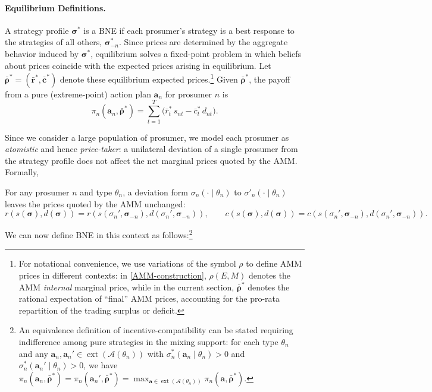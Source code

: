 \documentclass[12pt, notitlepage]{article}
\begin{document}
\paragraph{Equilibrium Definitions.}
A strategy profile $\boldsymbol{\sigma}^*$ is a BNE if each prosumer's strategy is a best response to the strategies of all others, $\boldsymbol{\sigma}_{-n}^*$. Since prices are determined by the aggregate behavior induced by $\boldsymbol{\sigma}^*$, equilibrium solves a fixed-point problem in which beliefs about prices coincide with the expected prices arising in equilibrium. Let $\bar{\boldsymbol{\rho}}^* = (\bar{\boldsymbol{r}}^*, \bar{\boldsymbol{c}}^*)$ denote these equilibrium expected prices.\footnote{For notational convenience, we use variations of the symbol $\rho$ to define AMM prices in different contexts: in \cref{AMM-construction}, $\rho(E,M)$ denotes the AMM \textit{internal} marginal price, while in the current section, $\bar{\boldsymbol{\rho}}^*$ denotes the rational expectation of ``final'' AMM prices, accounting for the pro-rata repartition of the trading surplus or deficit.} Given $\bar{\boldsymbol{\rho}}^*$, the payoff from a pure (extreme-point) action plan $\mathbf{a}_n$ for prosumer $n$ is
$$    \pi_n(\mathbf{a}_n, \bar{\boldsymbol{\rho}}^*)
        = \sum_{t=1}^T 
            \big( \bar{r}_t^*\, s_{nt} - \bar{c}_t^*\, d_{nt} \big).$$

Since we consider a large population of prosumer, we model each prosumer as \emph{atomistic} and hence \emph{price-taker}: a unilateral deviation of a single prosumer from the strategy profile does not affect the net marginal prices quoted by the AMM. Formally,

\begin{assumption}[Atomicity]\label{as:mean_field}
For any prosumer $n$ and type $\theta_n$, a deviation form  $\sigma_n(\cdot \mid \theta_n)$ to $\sigma'_n(\cdot \mid \theta_n)$ leaves the prices quoted by the AMM unchanged:
\[
r(s(\boldsymbol{\sigma}), d(\boldsymbol{\sigma}))
=
r(s(\sigma_n', \boldsymbol{\sigma}_{-n}), d(\sigma_n', \boldsymbol{\sigma}_{-n})),
\qquad
c(s(\boldsymbol{\sigma}), d(\boldsymbol{\sigma}))
=
c(s(\sigma_n', \boldsymbol{\sigma}_{-n}), d(\sigma_n', \boldsymbol{\sigma}_{-n})).
\]
\end{assumption}

We can now define BNE in this context as follows:\footnote{An equivalence definition of incentive-compatibility can be stated requiring indifference among pure strategies in the mixing support: for each type $\theta_n$ and any $\mathbf{a}_n,\mathbf{a}_n' \in \operatorname{ext}(\mathcal{A}(\theta_n))$ with $\sigma_n^*(\mathbf{a}_n \mid \theta_n) > 0$ and $\sigma_n^*(\mathbf{a}_n' \mid \theta_n) > 0$, we have
$\pi_n(\mathbf{a}_n,\bar{\boldsymbol{\rho}}^*) = \pi_n(\mathbf{a}_n',\bar{\boldsymbol{\rho}}^*) 
= \max_{\mathbf{a} \in \operatorname{ext}(\mathcal{A}(\theta_n))} \pi_n(\mathbf{a},\bar{\boldsymbol{\rho}}^*)$.}
\end{document}
